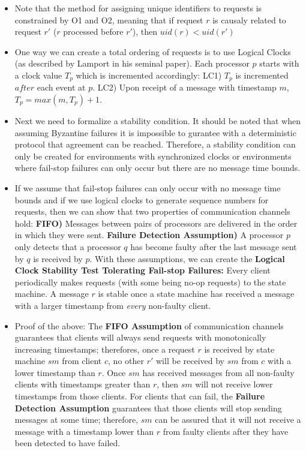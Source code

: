 \documentclass[a4paper]{article}
\begin{document}
\begin{itemize}
\begin{itemize}
\begin{itemize}
\item Note that the method for assigning unique identifiers to requests is constrained by O1 and O2, meaning that if request $r$ is causaly related to request $r'$ ($r$ processed before $r'$), then $uid(r) < uid(r')$

\item One way we can create a total ordering of requests is to use Logical Clocks (as described by Lamport in his seminal paper). Each processor $p$ starts with a clock value $T_p$ which is incremented accordingly: LC1) $T_p$ is incremented $after$ each event at $p$. LC2) Upon receipt of a message with timestamp $m$, $T_p = max(m, T_p) + 1$.

\item Next we need to formalize a stability condition. It should be noted that when assuming Byzantine failures it is impossible to gurantee with a deterministic protocol that agreement can be reached. Therefore, a stability condition can only be created for environments with synchronized clocks or environments where fail-stop failures can only occur but there are no message time bounds.

\item If we assume that fail-stop failures can only occur with no message time bounds and if we use logical clocks to generate sequence numbers for requests, then we can show that two properties of communication channels hold: \textbf{FIFO)} Messages between pairs of processors are delivered in the order in which they were sent. \textbf{Failure Detection Assumption)} A processor $p$ only detects that a processor $q$ has become faulty after the last message sent by $q$ is received by $p$. With these assumptions, we can create the \textbf{Logical Clock Stability Test Tolerating Fail-stop Failures:} Every client periodically makes requests (with some being no-op requests) to the state machine. A message $r$ is stable once a state machine has received a message with a larger timestamp from \textit{every} non-faulty client.

\item Proof of the above: The \textbf{FIFO Assumption} of communication channels guarantees that clients will always send requests with monotonically increasing timestamps; therefores, once a request $r$ is received by state machine $sm$ from client $c$, no other $r'$ will be received by $sm$ from $c$ with a lower timestamp than $r$. Once $sm$ has received messages from all non-faulty clients with timestamps greater than $r$, then $sm$ will not receive lower timestamps from those clients. For clients that can fail, the \textbf{Failure Detection Assumption} guarantees that those clients will stop sending messages at some time; therefore, $sm$ can be assured that it will not receive a message with a timestamp lower than $r$ from faulty clients after they have been detected to have failed.


\end{itemize}
\end{itemize}
\end{itemize}
\end{document}
